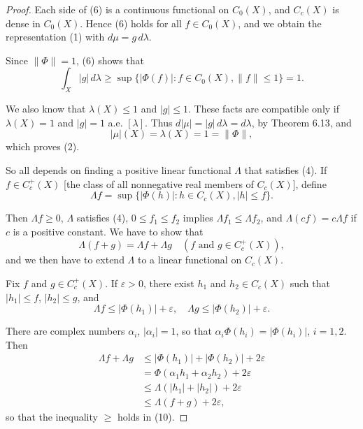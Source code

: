 \begin{proof}
Each side of (6) is a continuous functional on $C_0(X)$, and $C_c(X)$ is dense in $C_0(X)$. Hence (6) holds for all $f \in C_0(X)$, and we obtain the representation (1) with $d\mu = g \, d\lambda$.

Since $\|\Phi\| = 1$, (6) shows that
\begin{equation}
\int_X |g| \, d\lambda \geq \sup \{|\Phi(f)| : f \in C_0(X), \|f\| \leq 1\} = 1. \tag{7}
\end{equation}

We also know that $\lambda(X) \leq 1$ and $|g| \leq 1$. These facts are compatible only if $\lambda(X) = 1$ and $|g| = 1$ a.e. $[\lambda]$. Thus $d|\mu| = |g| \, d\lambda = d\lambda$, by Theorem 6.13, and
\begin{equation}
|\mu|(X) = \lambda(X) = 1 = \|\Phi\|, \tag{8}
\end{equation}
which proves (2).

So all depends on finding a positive linear functional $\Lambda$ that satisfies (4). If $f \in C_c^+(X)$ [the class of all nonnegative real members of $C_c(X)$], define
\begin{equation}
\Lambda f = \sup \{|\Phi(h)| : h \in C_c(X), |h| \leq f\}. \tag{9}
\end{equation}

Then $\Lambda f \geq 0$, $\Lambda$ satisfies (4), $0 \leq f_1 \leq f_2$ implies $\Lambda f_1 \leq \Lambda f_2$, and $\Lambda(cf) = c\Lambda f$ if $c$ is a positive constant. We have to show that
\begin{equation}
\Lambda(f + g) = \Lambda f + \Lambda g \quad (f \text{ and } g \in C_c^+(X)), \tag{10}
\end{equation}
and we then have to extend $\Lambda$ to a linear functional on $C_c(X)$.

Fix $f$ and $g \in C_c^+(X)$. If $\varepsilon > 0$, there exist $h_1$ and $h_2 \in C_c(X)$ such that $|h_1| \leq f$, $|h_2| \leq g$, and
\begin{equation}
\Lambda f \leq |\Phi(h_1)| + \varepsilon, \quad \Lambda g \leq |\Phi(h_2)| + \varepsilon. \tag{11}
\end{equation}

There are complex numbers $\alpha_i$, $|\alpha_i| = 1$, so that $\alpha_i \Phi(h_i) = |\Phi(h_i)|$, $i = 1, 2$. Then
\begin{align}
\Lambda f + \Lambda g &\leq |\Phi(h_1)| + |\Phi(h_2)| + 2\varepsilon\\
&= \Phi(\alpha_1 h_1 + \alpha_2 h_2) + 2\varepsilon\\
&\leq \Lambda(|h_1| + |h_2|) + 2\varepsilon\\
&\leq \Lambda(f + g) + 2\varepsilon,
\end{align}
so that the inequality $\geq$ holds in (10).


\end{proof}
